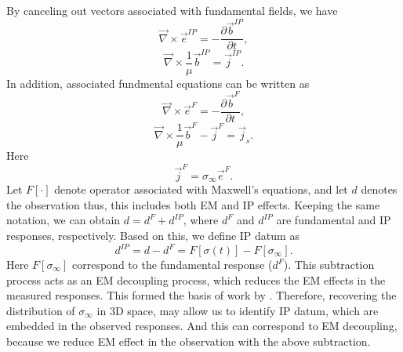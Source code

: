 \documentclass[a4paper, 11pt]{article}
\newcommand{\curl}{{\vec \nabla}\times}
\newcommand{\siginf}{\sigma_\infty}
\renewcommand {\j}  { {\vec j} }
\renewcommand {\b}  { {\vec b} }
\newcommand {\e}  { {\vec e} }
\newcommand{\dip}{d^{IP}}
\begin{document}
By canceling out vectors associated with fundamental fields, we have
\begin{equation}
  \curl \e^{IP} = -\frac{\partial \b^{IP}}{\partial t},
  \label{eq: eq_secondary_farad}
\end{equation}
\begin{equation}
  \curl{\frac{1}{\mu}\b^{IP}} = \j^{IP}.
  \label{eq: eq_secondary_coulomb}
\end{equation}
In addition, associated fundmental equations can be written as
\begin{equation}
  \curl \e^{F} = -\frac{\partial \b^{F}}{\partial t},
  \label{eq: eq_primary_farad}
\end{equation}
\begin{equation}
  \curl{\frac{1}{\mu}\b^{F}} -\j^{F} = \j_s.
  \label{eq: eq_primary_coulomb}
\end{equation}
Here
\begin{equation}
  \j^{F} = \siginf\e^{F}.
  \label{eq: jF}
\end{equation}
Let $F[\cdot]$ denote operator associated with Maxwell’s equations, and let $d$ denotes the observation thus, this includes both EM and IP effects. 
Keeping the same notation, we can obtain $d = d^{F} + \dip$, where $d^F$ and $\dip$ are fundamental and IP responses, respectively. 
Based on this, we define IP datum as 
\begin{equation}
  \dip = d - d^{F} = F[\sigma(t)]-F[\siginf].
    \label{eq: IPdatum_syn}
\end{equation}
Here $F[\siginf]$ correspond to the fundamental response ($d^F$). 
This subtraction process acts as an EM decoupling process, which reduces the EM effects in the measured responses. 
This formed the basis of work by \cite{routh2001}. 
Therefore, recovering the distribution of $\siginf$ in 3D space, may allow us to identify IP datum, which are embedded in the observed responses. 
And this can correspond to EM decoupling, because we reduce EM effect in the observation with the above subtraction. 

\end{document}
